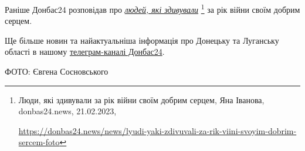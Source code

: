 
Раніше Донбас24 розповідав про \href{https://donbas24.news/news/lyudi-yaki-zdivuvali-za-rik-viini-svoyim-dobrim-sercem-foto}{\emph{людей, які здивували}}%
\footnote{Люди, які здивували за рік війни своїм добрим серцем, Яна Іванова, donbas24.news, 21.02.2023, \par\url{https://donbas24.news/news/lyudi-yaki-zdivuvali-za-rik-viini-svoyim-dobrim-sercem-foto}}
за рік війни своїм добрим серцем.

Ще більше новин та найактуальніша інформація про Донецьку та Луганську області
в нашому \href{https://t.me/donbas24}{телеграм-каналі Донбас24}.

ФОТО: Євгена Сосновського

